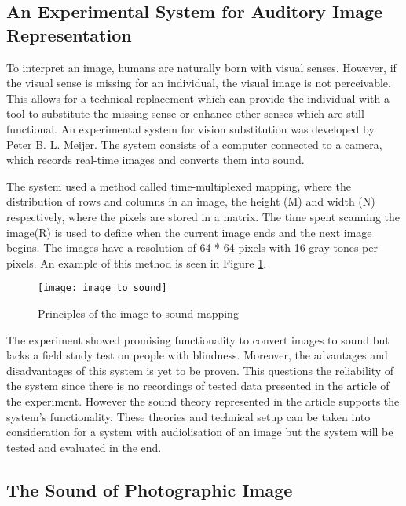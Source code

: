  
\subsection{An Experimental System for Auditory Image Representation}\label{sec:experimentalsystem}

To interpret an image, humans are naturally born with visual senses. However, if the visual sense is missing for an individual, the visual image is not perceivable. This allows for a technical replacement which can provide the individual with a tool to substitute the missing sense or enhance other senses which are still functional. An experimental system for vision substitution was developed by Peter B. L. Meijer\cite{Meijer1992}. The system consists of a computer connected to a camera, which records real-time images and converts them into sound. 

The system used a method called time-multiplexed mapping, where the distribution of rows and columns in an image, the height (M) and width (N) respectively, where the pixels are stored in a matrix. The time spent scanning the image(R) is used to define when the current image ends and the next image begins. The images have a resolution of 64 * 64 pixels with 16 gray-tones per pixels. An example of this method is seen in Figure \ref{fig:image_to_sound}. 

\begin{figure}[!h] 
\centering
\texttt{[image: image\_to\_sound]}
\caption{\label{fig:image_to_sound} Principles of the image-to-sound mapping \cite{Meijer1992}}
\end{figure}
  
The experiment showed promising functionality to convert images to sound but lacks a field study test on people with blindness. Moreover, the advantages and disadvantages of this system is yet to be proven. This questions the reliability of the system since there is no recordings of tested data presented in the article of the experiment. However the sound theory represented in the article supports the system's functionality.  These theories and technical setup can be taken into consideration for a system with audiolisation of an image but the system will be tested and evaluated in the end.    

\subsection{The Sound of Photographic Image}\label{sec:soundarticle}


